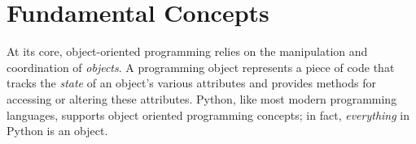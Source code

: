 \section*{Fundamental Concepts}

\begin{comment}
At its core, object oriented programming relies on the manipulation and coordination of objects.
An object represents a piece of code that tracks a state and provides methods for discovering or altering the state.


There are a few concepts that define object oriented programming

\begin{itemize}

\item Abstraction - appropriate representation of states and data

\item Encapsulation - independent behavior

\item Inheritance - relations between objects

\end{itemize}

The general advantage of using these concepts is that it helps with organizing code.
``Abstraction" permits the presentation of only necessary details about an object to the user.
For example, when we ask someone if they own a computer, we can use abstraction to ask the question ``Do you own a computer?'' rather than asking about each and every combination of hardware that we could classify as a computer.
Inheritance helps us easily achieve this abstraction.
We could have an object called \li{Computer}.
Various brands would then subclass, or inherit, the properties of \li{Computer}.
We could continue by having each product line inherit from their respective brands, until we arrive at the product level.
Then each individual product would represent an instantiation of that product's class.
Encapsulation means each function contains all of the data it needs to calculate a result.
Encapsulation is used to avoid the use of global data structures and makes managing data involved in computation more convenient.
\end{comment}

At its core, object-oriented programming relies on the manipulation and coordination of \emph{objects}.
A programming object represents a piece of code that tracks the \emph{state} of an object's various attributes and provides methods for accessing or altering these attributes. 
Python, like most modern programming languages, supports object oriented programming concepts; in fact, \emph{everything} in Python is an object.

